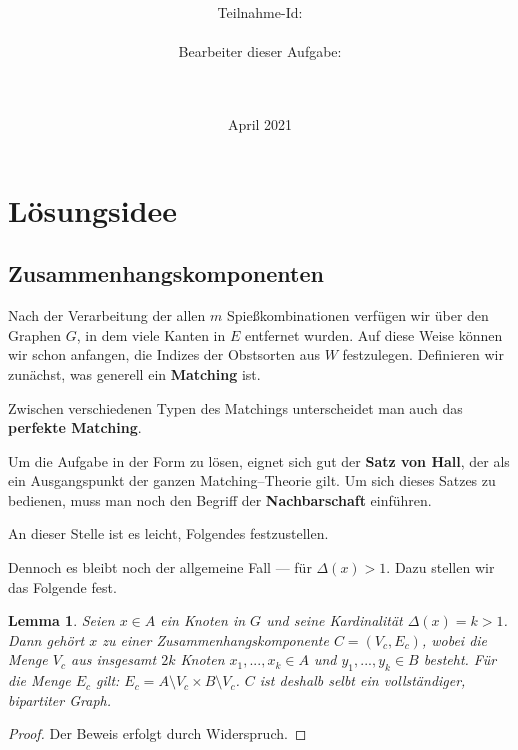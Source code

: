 \documentclass[a4paper,10pt,ngerman]{scrartcl}
\title{\textbf{\Huge\Aufgabe}}
\author{\LARGE Teilnahme-Id: \LARGE \TeilnahmeId \\\\
	    \LARGE Bearbeiter dieser Aufgabe: \\ 
	    \LARGE \Namen\\\\}
\date{\LARGE April 2021}
\newtheorem{lemma}{Lemma}
\newcommand{\TODO}[1]{\todo[inline]{TODO: #1}}
\newcommand{\tbf}[1]{\textbf{#1}}
\begin{document}
\maketitle
\tableofcontents

\section{Lösungsidee}






\subsection{Zusammenhangskomponenten}
Nach der Verarbeitung der allen $m$ Spießkombinationen verfügen wir über den Graphen $G$,
in dem viele Kanten in $E$ entfernet wurden.
Auf diese Weise können wir schon anfangen, die Indizes der Obstsorten aus $W$ festzulegen.
Definieren wir zunächst, was generell ein \tbf{Matching} ist.



\noindent
Zwischen verschiedenen Typen des Matchings unterscheidet man auch das \tbf{perfekte Matching}.



\noindent
Um die Aufgabe in der Form zu lösen, eignet sich gut der \tbf{Satz von Hall},
der als ein Ausgangspunkt der ganzen Matching--Theorie gilt. 
Um sich dieses Satzes zu bedienen, muss man noch den Begriff der \tbf{Nachbarschaft} einführen.





An dieser Stelle ist es leicht, Folgendes festzustellen.



Dennoch es bleibt noch der allgemeine Fall --- für $\Delta(x) > 1$.
Dazu stellen wir das Folgende fest.

\begin{lemma}\label{lem:grad-groesser1}
Seien $x \in A$ ein Knoten in $G$ und seine Kardinalität $\Delta(x) = k > 1$.
Dann gehört $x$ zu einer Zusammenhangskomponente $C = (V_c, E_c)$, wobei
die Menge $V_c$ aus insgesamt $2k$ Knoten $x_1, ..., x_k \in A$ 
und $y_1, ..., y_k \in B$ besteht. Für die Menge $E_c$ gilt:
$E_c = A \setminus V_c \times B \setminus V_c $.
$C$ ist deshalb selbt ein vollständiger, bipartiter Graph.
\end{lemma}
\begin{proof}
Der Beweis erfolgt durch Widerspruch.
\TODO{Beweis} 
\end{proof}
\end{document}
